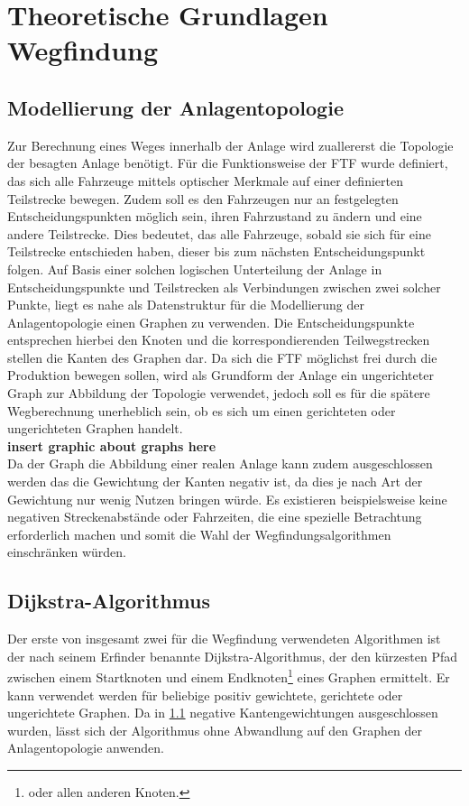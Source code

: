 \chapter{Theoretische Grundlagen Wegfindung}

\section{Modellierung der Anlagentopologie}
	\label{Graph_Anlage}
	Zur Berechnung eines Weges innerhalb der Anlage wird zuallererst die Topologie der besagten Anlage benötigt. Für die Funktionsweise der \ac{FTF} wurde definiert, das sich alle Fahrzeuge mittels optischer Merkmale auf einer definierten Teilstrecke bewegen. Zudem soll es den Fahrzeugen nur an festgelegten Entscheidungspunkten möglich sein, ihren Fahrzustand zu ändern und eine andere Teilstrecke. Dies bedeutet, das alle Fahrzeuge, sobald sie sich für eine Teilstrecke entschieden haben, dieser bis zum nächsten Entscheidungspunkt folgen. Auf Basis einer solchen logischen Unterteilung der Anlage in Entscheidungspunkte und Teilstrecken als Verbindungen zwischen zwei solcher Punkte, liegt es nahe als Datenstruktur für die Modellierung der Anlagentopologie einen Graphen zu verwenden. Die Entscheidungspunkte entsprechen hierbei den Knoten und die korrespondierenden Teilwegstrecken stellen die Kanten des Graphen dar. Da sich die \ac{FTF} möglichst frei durch die Produktion bewegen sollen, wird als Grundform der Anlage ein ungerichteter Graph zur Abbildung der Topologie verwendet, jedoch soll es für die spätere Wegberechnung unerheblich sein, ob es sich um einen gerichteten oder ungerichteten Graphen handelt.\\
	\textbf{insert graphic about graphs here}\\
	Da der Graph die Abbildung einer realen Anlage kann zudem ausgeschlossen werden das die Gewichtung der Kanten negativ ist, da dies je nach Art der Gewichtung nur wenig Nutzen bringen würde. Es existieren beispielsweise keine negativen Streckenabstände oder Fahrzeiten, die eine spezielle Betrachtung erforderlich machen und somit die Wahl der Wegfindungsalgorithmen einschränken würden.
\section{Dijkstra-Algorithmus}
	Der erste von insgesamt zwei für die Wegfindung verwendeten Algorithmen ist der nach seinem Erfinder benannte Dijkstra-Algorithmus, der den kürzesten Pfad zwischen einem Startknoten und einem Endknoten\footnote{oder allen anderen Knoten.} eines Graphen ermittelt. Er kann verwendet werden für beliebige positiv gewichtete, gerichtete oder ungerichtete Graphen. Da in \ref{Graph_Anlage} negative Kantengewichtungen ausgeschlossen wurden, lässt sich der Algorithmus ohne Abwandlung auf den Graphen der Anlagentopologie anwenden.
